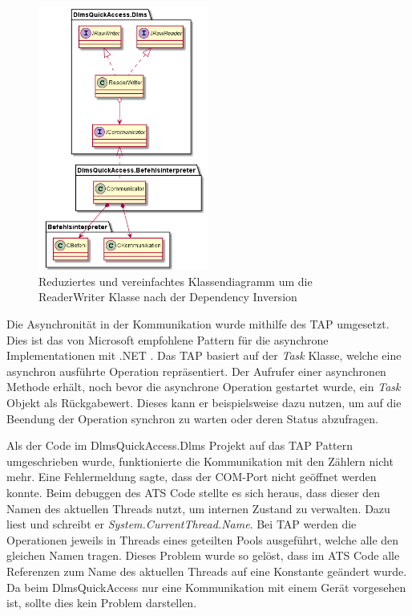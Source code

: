 \begin{figure}[H]
   \centering
   \includegraphics[width=0.5\textwidth]{gfx/dlms_nachher.png}
   \caption{
      Reduziertes und vereinfachtes Klassendiagramm um die ReaderWriter Klasse nach der Dependency Inversion
   }
   \label{fig:dlms_nachher}
\end{figure}

Die Asynchronität in der Kommunikation wurde mithilfe des \ac{TAP} umgesetzt.
Dies ist das von Microsoft empfohlene Pattern für die asynchrone Implementationen mit .NET \parencite{async}.
Das \ac{TAP} basiert auf der \textit{Task} Klasse, welche eine asynchron ausführte Operation repräsentiert.
Der Aufrufer einer asynchronen Methode erhält, noch bevor die asynchrone Operation gestartet wurde, ein \textit{Task} Objekt als Rückgabewert.
Dieses kann er beispielsweise dazu nutzen, um auf die Beendung der Operation synchron zu warten oder deren Status abzufragen.

Als der Code im DlmsQuickAccess.Dlms Projekt auf das \ac{TAP} Pattern umgeschrieben wurde, funktionierte die Kommunikation mit den Zählern nicht mehr.
Eine Fehlermeldung sagte, dass der COM-Port nicht geöffnet werden konnte.
Beim debuggen des \ac{ATS} Code stellte es sich heraus, dass dieser den Namen des aktuellen Threads nutzt, um internen Zustand zu verwalten.
Dazu liest und schreibt er \textit{System.CurrentThread.Name}.
Bei \ac{TAP} werden die Operationen jeweils in Threads eines geteilten Pools ausgeführt, welche alle den gleichen Namen tragen.
Dieses Problem wurde so gelöst, dass im \ac{ATS} Code alle Referenzen zum Name des aktuellen Threads auf eine Konstante geändert wurde.
Da beim DlmsQuickAccess nur eine Kommunikation mit einem Gerät vorgesehen ist, sollte dies kein Problem darstellen.


